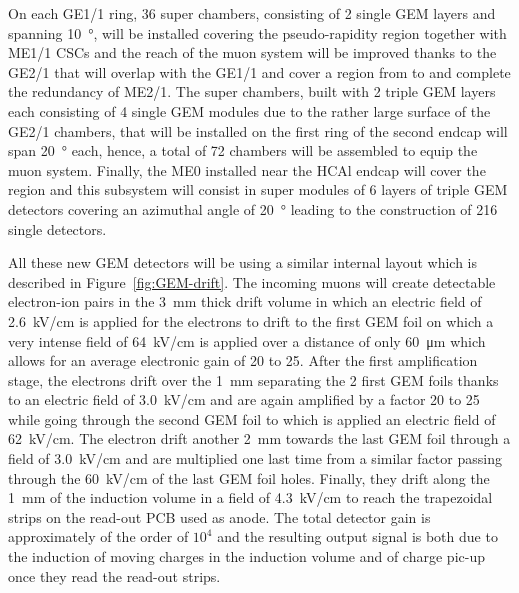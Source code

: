 	On each GE1/1 ring, 36 super chambers, consisting of 2 single GEM layers and spanning \SI{10}{\degree}, will be installed covering the pseudo-rapidity region  together with ME1/1 CSCs and the reach of the muon system will be improved thanks to the GE2/1 that will overlap with the GE1/1 and cover a region from  to  and complete the redundancy of ME2/1. The super chambers, built with 2 triple GEM layers each consisting of 4 single GEM modules due to the rather large surface of the GE2/1 chambers, that will be installed on the first ring of the second endcap will span \SI{20}{\degree} each, hence, a total of 72 chambers will be assembled to equip the muon system. Finally, the ME0 installed near the HCAl endcap will cover the region  and this subsystem will consist in super modules of 6 layers of triple GEM detectors covering an azimuthal angle of \SI{20}{\degree} leading to the construction of 216 single detectors.
	
	All these new GEM detectors will be using a similar internal layout which is described in Figure~\ref{fig:GEM-drift}. The incoming muons will create detectable electron-ion pairs in the \SI{3}{mm} thick drift volume in which an electric field of \SI{2.6}{kV/cm} is applied for the electrons to drift to the first GEM foil on which a very intense field of \SI{64}{kV/cm} is applied over a distance of only \SI{60}{\micro m} which allows for an average electronic gain of 20 to 25. After the first amplification stage, the electrons drift over the \SI{1}{mm} separating the 2 first GEM foils thanks to an electric field of \SI{3.0}{kV/cm} and are again amplified by a factor 20 to 25 while going through the second GEM foil to which is applied an electric field of \SI{62}{kV/cm}. The electron drift another \SI{2}{mm} towards the last GEM foil through a field of \SI{3.0}{kV/cm} and are multiplied one last time from a similar factor passing through the \SI{60}{kV/cm} of the last GEM foil holes. Finally, they drift along the \SI{1}{mm} of the induction volume in a field of \SI{4.3}{kV/cm} to reach the trapezoidal strips on the read-out PCB used as anode. The total detector gain is approximately of the order of $10^4$ and the resulting output signal is both due to the induction of moving charges in the induction volume and of charge pic-up once they read the read-out strips.

